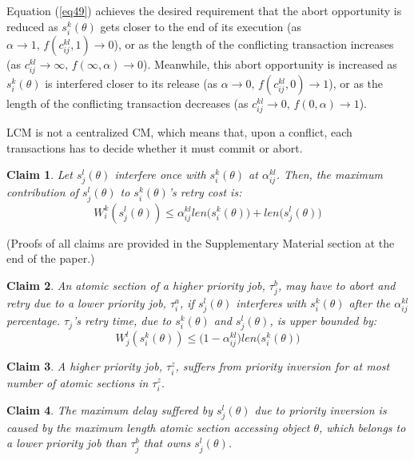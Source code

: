 \documentclass[letter]{sig-alternate}
\newtheorem{clm}{Claim}
\begin{document}
Equation (\ref{eq49}) achieves the desired requirement that the abort opportunity is reduced as $s_{i}^{k}(\theta)$ gets
closer to the end of its execution (as $\alpha\rightarrow1,\, f(c_{ij}^{kl},1)\rightarrow0$),
or as the length of the conflicting transaction increases (as $c_{ij}^{kl}\rightarrow\infty,\, f(\infty,\alpha)\rightarrow0$).
Meanwhile, this abort opportunity is increased as $s_{i}^{k}(\theta)$
is interfered closer to its release (as $\alpha\rightarrow0,\, f(c_{ij}^{kl},0)\rightarrow1$),
or as the length of the conflicting transaction decreases (as $c_{ij}^{kl}\rightarrow0,\, f(0,\alpha)\rightarrow1$).

LCM is not a centralized CM, which means that, upon a conflict, each transactions has to decide whether it must commit or abort. 

\begin{clm}
\label{LCM_higher_rc}
Let $s_{j}^{l}(\theta)$ interfere once with $s_{i}^{k}(\theta)$ at $\alpha_{ij}^{kl}$. Then, the maximum contribution of $s_{j}^{l}(\theta)$ to 
$s_{i}^{k}(\theta)$'s 
retry cost is:
\begin{equation}
W_i^k(s_j^l(\theta))\le \alpha_{ij}^{kl}len\Big(s_{i}^{k}(\theta)\Big)+len\Big(s_{j}^{l}(\theta)\Big)\label{eq47}\end{equation}
\end{clm}
(Proofs of all claims are provided in the Supplementary Material section at the end of the paper.)


\begin{clm}
\label{LCM_lower_rc}
An atomic section of a higher priority job, $\tau_{j}^b$, may have to abort and retry due to a lower priority job, $\tau_{i}^a$, if $s_{j}^{l}(\theta)$ interferes
with $s_{i}^{k}(\theta)$ after the $\alpha_{ij}^{kl}$ percentage. $\tau_{j}$'s retry time, due to $s_{i}^{k}(\theta)$ and $s_{j}^{l}(\theta)$,
is upper bounded by:
 \begin{equation}
W_j^l(s_i^k(\theta))\le \Big(1-\alpha_{ij}^{kl}\Big)len\Big(s_{i}^{k}(\theta)\Big)\label{eq48}\end{equation}
\end{clm}

\begin{clm}
\label{priority_inversion}
A higher priority job, $\tau_i^z$, suffers from priority inversion for at most number of atomic sections in $\tau_i^z$.
\end{clm}

\begin{clm}
\label{max_pri_inv}
The maximum delay suffered by $s_j^l(\theta)$ due to priority inversion is caused by the maximum length atomic section accessing object $\theta$, which belongs to a lower priority job than $\tau_j^b$ that owns $s_j^l(\theta)$.
\end{clm}
\end{document}
